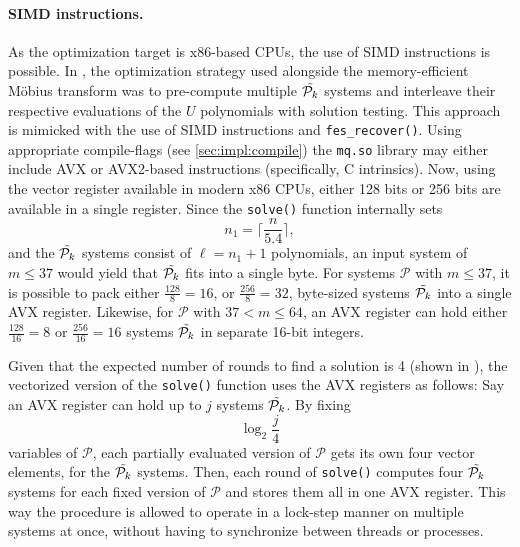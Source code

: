 
\paragraph{SIMD instructions.} As the optimization target is x86-based CPUs, the use of SIMD instructions is possible. In \cite{eurocrypt-2021-30841}, the optimization strategy used alongside the memory-efficient Möbius transform was to pre-compute multiple $\Tilde{\mathcal{P}_k}$ systems and interleave their respective evaluations of the $U$ polynomials with solution testing. This approach is mimicked with the use of SIMD instructions and \texttt{fes\_recover()}.
Using appropriate compile-flags (see \cref{sec:impl:compile}) the \texttt{mq.so} library may either include AVX or AVX2-based instructions (specifically, C intrinsics). Now, using the vector register available in modern x86 CPUs, either 128 bits or 256 bits are available in a single register. Since the \texttt{solve()} function internally sets 
$$
    n_1 = \lceil \frac{n}{5.4}\rceil,
$$
and the $\Tilde{\mathcal{P}_k}$ systems consist of $\ell = n_1 + 1$ polynomials, an input system of $m \leq 37$ would yield that $\Tilde{\mathcal{P}_k}$ fits into a single byte. For systems $\mathcal{P}$ with $m \leq 37$, it is possible to pack either $\frac{128}{8} = 16$, or $ \frac{256}{8} = 32$, byte-sized systems $\Tilde{\mathcal{P}_k}$ into a single AVX register. Likewise, for $\mathcal{P}$ with $37 < m \leq 64$, an AVX register can hold either $\frac{128}{16} = 8$ or $\frac{256}{16} = 16$ systems $\Tilde{\mathcal{P}_k}$ in separate 16-bit integers. 

Given that the expected number of rounds to find a solution is 4 (shown in \cite{eurocrypt-2021-30841}), the vectorized version of the \texttt{solve()} function uses the AVX registers as follows: Say an AVX register can hold up to $j$ systems $\Tilde{\mathcal{P}_k}$. By fixing 
$$
    \log_2 \frac{j}{4}
$$ 
variables of $\mathcal{P}$, each partially evaluated version of $\mathcal{P}$ gets its own four vector elements, for the $\Tilde{\mathcal{P}_k}$ systems. Then, each round of \texttt{solve()} computes four $\Tilde{\mathcal{P}_k}$ systems for each fixed version of $\mathcal{P}$ and stores them all in one AVX register. This way the procedure is allowed to operate in a lock-step manner on multiple systems at once, without having to synchronize between threads or processes. 

